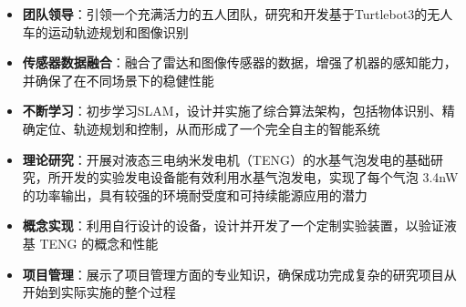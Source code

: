 \begin{itemize}
\footnotesize
  \item \textbf{团队领导}：引领一个充满活力的五人团队，研究和开发基于Turtlebot3的无人车的运动轨迹规划和图像识别
  \item \textbf{传感器数据融合}：融合了雷达和图像传感器的数据，增强了机器的感知能力，并确保了在不同场景下的稳健性能
  \item \textbf{不断学习}：初步学习SLAM，设计并实施了综合算法架构，包括物体识别、精确定位、轨迹规划和控制，从而形成了一个完全自主的智能系统
\end{itemize}

\begin{itemize}
\small 
  \item \textbf{理论研究}：开展对液态三电纳米发电机（TENG）的水基气泡发电的基础研究，所开发的实验发电设备能有效利用水基气泡发电，实现了每个气泡 3.4nW 的功率输出，具有较强的环境耐受度和可持续能源应用的潜力
  \item \textbf{概念实现}：利用自行设计的设备，设计并开发了一个定制实验装置，以验证液基 TENG 的概念和性能
  \item \textbf{项目管理}：展示了项目管理方面的专业知识，确保成功完成复杂的研究项目从开始到实际实施的整个过程
\end{itemize}


